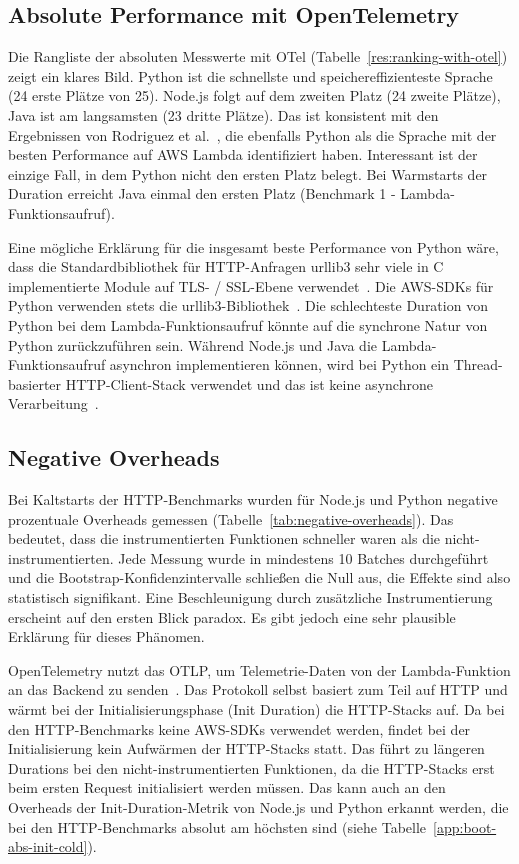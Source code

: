 \subsection{Absolute Performance mit OpenTelemetry}

Die Rangliste der absoluten Messwerte mit OTel (Tabelle~\ref{res:ranking-with-otel}) zeigt ein klares Bild. 
Python ist die schnellste und speichereffizienteste Sprache (24 erste Plätze von 25). Node.js folgt auf dem zweiten Platz 
(24 zweite Plätze), Java ist am langsamsten (23 dritte Plätze). Das ist konsistent mit den Ergebnissen von Rodriguez et 
al.~\cite{Rodriguez2024Evaluation}, die ebenfalls Python als die Sprache mit der besten Performance auf AWS Lambda identifiziert haben. 
Interessant ist der einzige Fall, in dem Python nicht den ersten Platz belegt. Bei Warmstarts der Duration erreicht Java einmal 
den ersten Platz (Benchmark 1 - Lambda-Funktionsaufruf). 

Eine mögliche Erklärung für die insgesamt beste Performance von Python wäre, dass die Standardbibliothek für HTTP-Anfragen urllib3 sehr viele in C 
implementierte Module auf TLS- / SSL-Ebene verwendet~\cite{Urllib3}. Die AWS-SDKs für Python verwenden stets die urllib3-Bibliothek~\cite{Boto3}. 
Die schlechteste Duration von Python bei dem Lambda-Funktionsaufruf könnte auf die synchrone Natur von Python 
zurückzuführen sein. Während Node.js und Java die Lambda-Funktionsaufruf asynchron implementieren können, wird 
bei Python ein Thread-basierter HTTP-Client-Stack verwendet und das ist keine asynchrone Verarbeitung~\cite{Boto3}. 
\subsection{Negative Overheads}

Bei Kaltstarts der HTTP-Benchmarks wurden für Node.js und Python negative prozentuale Overheads gemessen 
(Tabelle~\ref{tab:negative-overheads}). Das bedeutet, dass die instrumentierten Funktionen schneller waren als die 
nicht-instrumentierten. Jede Messung wurde in mindestens 10 Batches durchgeführt und die Bootstrap-Konfidenzintervalle 
schließen die Null aus, die Effekte sind also statistisch signifikant.
Eine Beschleunigung durch zusätzliche Instrumentierung erscheint auf den ersten Blick paradox. Es gibt jedoch eine 
sehr plausible Erklärung für dieses Phänomen.

OpenTelemetry nutzt das \ac{OTLP}, um Telemetrie-Daten von der Lambda-Funktion an das Backend zu 
senden~\cite{OTelProtoSpec}. Das Protokoll selbst basiert zum Teil auf HTTP und wärmt bei der 
Initialisierungsphase (Init Duration) die HTTP-Stacks auf. Da bei den HTTP-Benchmarks keine 
AWS-SDKs verwendet werden, findet bei der Initialisierung kein Aufwärmen der HTTP-Stacks statt. 
Das führt zu längeren Durations bei den nicht-instrumentierten Funktionen, da die HTTP-Stacks 
erst beim ersten Request initialisiert werden müssen. Das kann auch an den Overheads der 
Init-Duration-Metrik von Node.js und Python erkannt werden, die bei den HTTP-Benchmarks absolut am 
höchsten sind (siehe Tabelle~\ref{app:boot-abs-init-cold}).


